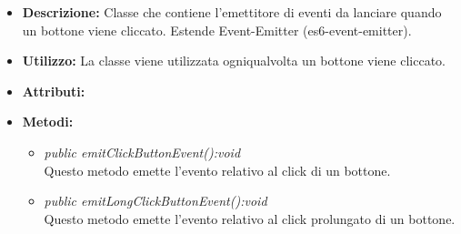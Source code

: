\begin{itemize}
\item \textbf{Descrizione:} Classe che contiene l'emettitore di eventi da lanciare quando un bottone viene cliccato. Estende Event-Emitter (es6-event-emitter).
\item \textbf{Utilizzo:} La classe viene utilizzata ogniqualvolta un bottone viene cliccato.
\item \textbf{Attributi:}
\item \textbf{Metodi:}
\begin{itemize}
\item \textit{public emitClickButtonEvent():void}\\
Questo metodo emette l'evento relativo al click di un bottone.
\item \textit{public emitLongClickButtonEvent():void}\\
Questo metodo emette l'evento relativo al click prolungato di un bottone.
\end{itemize}
\end{itemize}